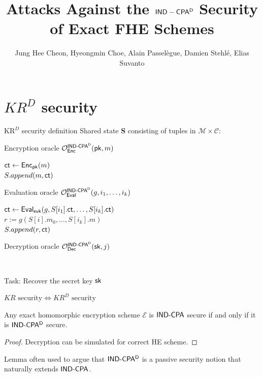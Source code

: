 \documentclass{beamer}
\title{Attacks Against the $\sf{IND-CPA^D}$ Security of Exact FHE Schemes}
\author{Jung Hee Cheon, Hyeongmin Choe, Alain Passelègue, Damien Stehlé, Elias Suvanto}
\begin{document}
	\begin{frame}[plain]
	    \maketitle
	\end{frame}
	
	\section{$KR^D$ security}

	\begin{frame}{$\text{KR}^D$ security definition}
		Shared state \textbf{S} consisting of tuples in $\mathcal{M} \times \mathcal{C}$:
		\begin{algorithm}[H]
			\scriptsize
			\caption{Encryption oracle ${\mathcal O}_{\sf Enc}^\text{\sf IND-CPA$\sf ^D$}({\sf pk}, m)$}
			$\mathsf{ct} \gets {\sf Enc}_{{\sf pk}}(m)$\\
			$S.append(m, \mathsf{ct})$\\
			\Return{$\ct$}
		\end{algorithm}
		\begin{algorithm}[H]
			\scriptsize
			\caption{Evaluation oracle ${\mathcal O}_{\mathsf{Eval}}^\text{\sf IND-CPA$\sf ^D$}(g, i_1, \dots, i_k)$}
			$\ct \gets \Eval_{\evk}(g, S[i_1].\ct, \dots, S[i_k].\ct)$\\
			$r := g(S[i].m_0, \dots, S[i_k].m)$\\
			$S.append(r, \mathsf{ct})$\\
			\Return{$\ct$}
		\end{algorithm}
		
		\begin{algorithm}[H]
			\caption{Decryption oracle ${\mathcal O}_{\sf Dec}^\text{\sf IND-CPA$\sf ^D$}({\sf sk}, j)$}
			\\
		\end{algorithm}
	Task: Recover the secret key ${\sf sk}$
	\end{frame}

	\begin{frame}{$KR \text{ security} \Leftrightarrow KR^D \text{ security}$}
		\begin{center}
		\begin{theorem}[LIMI21]
			Any exact homomorphic encryption scheme $\mathcal{E}$ is $\text{\sf IND-CPA}$ secure if and only if it is $\text{\sf IND-CPA$\sf ^D$}$ secure.
		\end{theorem}
		\begin{proof}
			Decryption can be simulated for correct HE scheme.
		\end{proof}
	\end{center}
	
		Lemma often used to argue that $\text{\sf IND-CPA$\sf ^D$}$ is a passive security notion that naturally extends $\text{\sf IND-CPA}$.
	\end{frame}
\end{document}
